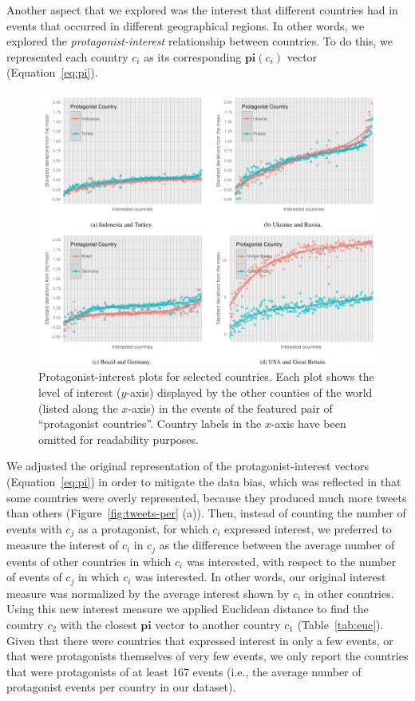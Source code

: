 
Another aspect that we explored was the interest that different countries had in
events that occurred in different geographical regions. 
%
In other words, we explored the \emph{protagonist-interest} relationship between
countries. 
%
To do this, we represented each country $c_i$ as its corresponding
$\mathbf{pi}(c_i)$ vector (Equation~\ref{eq:pi}).


\begin{figure}[t]
\centering
\includegraphics[width=\textwidth]{figures/geopolitical/int_prot.pdf}
\caption[Protagonist-interest plots for selected
countries.]{Protagonist-interest plots for selected countries.  Each plot shows
the level of interest ($y$-axis) displayed by the other counties of the world
(listed along the $x$-axis) in the events of the featured pair of ``protagonist
countries''. Country labels in the $x$-axis have been omitted for readability
purposes.}
\label{fig:int-prot}
\end{figure}

We adjusted the original representation of the protagonist-interest vectors
(Equation~\ref{eq:pi}) in order to mitigate the data bias, which was reflected
in that some countries were overly represented, because they produced much more
tweets than others (Figure~\ref{fig:tweets-per} (a)). 
%
Then, instead of counting the number of events with $c_j$ as a protagonist, for
which $c_i$ expressed interest, we preferred to measure the interest of $c_i$ in
$c_j$ as the difference between the average number of events of other countries
in which $c_i$ was interested, with respect to the number of events of $c_j$ in
which $c_i$ was interested. 
%
In other words, our original interest measure was normalized by the average
interest shown by $c_i$ in other countries. 
%
Using this new interest measure we applied Euclidean distance to find the
country $c_2$ with the closest $\mathbf{pi}$ vector to another country $c_1$
(Table~\ref{tab:euc}).
%
Given that there were countries that expressed interest in only a few events, or
that were protagonists themselves of very few events, we only report the
countries that were protagonists of at least 167 events (i.e., the average
number of protagonist events per country in our dataset).

